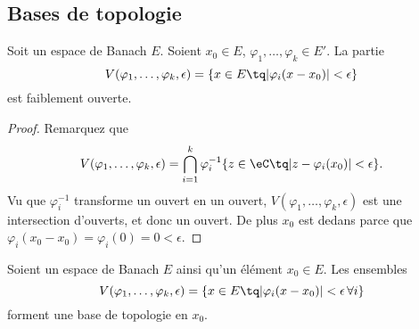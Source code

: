\subsection{Bases de topologie}


\begin{lemma}			\label{LEMooEFVXooIWBBdW}
	Soit un espace de Banach \( E\). Soient \( x_0\in E\), \( \varphi_1,\ldots, \varphi_k\in E'\). La partie
	\begin{equation}
		V(\varphi_1,\ldots, \varphi_k,\epsilon)=\{ x\in E\tq | \varphi_i(x-x_0) |<\epsilon \}
	\end{equation}
	est faiblement ouverte.
\end{lemma}

\begin{proof}
	Remarquez que
	\begin{equation}
		V(\varphi_1,\ldots, \varphi_k,\epsilon)=\bigcap_{i=1}^k\varphi_i^{-1}\{ z\in \eC\tq | z-\varphi_i(x_0) | <\epsilon \}.
	\end{equation}
	Vu que \( \varphi_i^{-1}\) transforme un ouvert en un ouvert, \( V(\varphi_1,\ldots, \varphi_k,\epsilon)\) est une intersection d'ouverts, et donc un ouvert. De plus \( x_0\) est dedans parce que \( \varphi_i(x_0-x_0)=\varphi_i(0)=0 <\epsilon\).
\end{proof}

\begin{lemma}
	Soient un espace de Banach \( E\) ainsi qu'un élément \( x_0\in E\). Les ensembles
	\begin{equation}
		V(\varphi_1,\ldots, \varphi_k,\epsilon)=\{ x\in E\tq | \varphi_i(x-x_0) |<\epsilon\,\forall i \}
	\end{equation}
	forment une base de topologie en \( x_0\).
\end{lemma}

